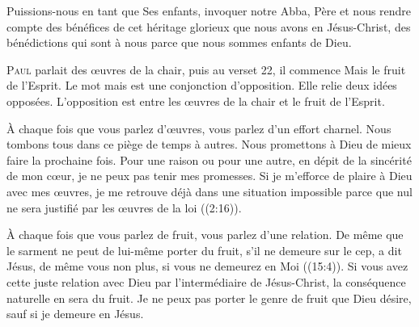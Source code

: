 Puissions-nous en tant que Ses enfants, invoquer notre Abba,
 Père et nous rendre compte des bénéfices de cet héritage glorieux
 que nous avons en Jésus-Christ, des bénédictions qui sont à nous
 parce que nous sommes enfants de Dieu. 

\dvrule







\lettrine{P}{aul} parlait des \oe{}uvres de la chair,
 puis au verset 22, il commence\frcolon{} 
 \Og Mais le fruit de l'Esprit. \Fg{}
 Le mot \Og mais \Fg{} est une conjonction d'opposition.
 Elle relie deux idées opposées.
 L'opposition est entre les \oe{}uvres de la chair et le fruit de l'Esprit.

À chaque fois que vous parlez d'\oe{}uvres, vous parlez d'un effort charnel.
 Nous tombons tous dans ce piège de temps à autres. Nous promettons à Dieu
 de mieux faire la prochaine fois. Pour une raison ou pour une autre,
 en dépit de la sincérité de mon c\oe{}ur, je ne peux pas tenir mes promesses.
 Si je m'efforce de plaire à Dieu avec mes \oe{}uvres, je me retrouve déjà
 dans une situation impossible parce que 
 \Og nul ne sera justifié par les \oe{}uvres de la loi \Fg{}
 ((2:16)). 



À chaque fois que vous parlez de fruit, vous parlez d'une relation.
 \Og De même que le sarment ne peut de lui-même porter du fruit,
 s'il ne demeure sur le cep, a dit Jésus, 
 de même vous non plus, si vous ne demeurez en Moi \Fg{}
 ((15:4)).
 Si vous avez cette juste relation avec Dieu par l'intermédiaire de Jésus-Christ,
 la conséquence naturelle en sera du fruit. Je ne peux pas porter
 le genre de fruit que Dieu désire, sauf si je demeure en Jésus.

